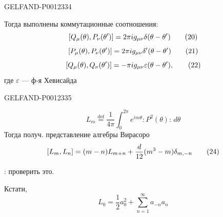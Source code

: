 \begin{GelfandAdjacentEvidence}{GELFAND-P001233}{4}

Тогда выполнены коммутационные соотношения:
\begin{equation*}
\relax [Q_\mu(\theta),P_\nu(\theta')]=2\pi i g_{\mu\nu}\delta(\theta-\theta')\tag{20}
\end{equation*}
\begin{equation*}
\relax [P_\mu(\theta),P_\nu(\theta')]=2\pi i g_{\mu\nu}\delta'(\theta-\theta')\tag{21}
\end{equation*}
\begin{equation*}
\relax [Q_\mu(\theta),Q_\nu(\theta')]=-\pi i g_{\mu\nu}\varepsilon(\theta-\theta'),\tag{22}
\end{equation*}
где \(\varepsilon\) --- ф-я Хевисайда
\end{GelfandAdjacentEvidence}
\begin{GelfandAdjacentEvidence}{GELFAND-P001233}{5}

\begin{equation*}
L_m\overset{\mathrm{def}}{=}\frac1{4\pi}\int_0^{2\pi}
e^{im\theta}:P^2(\theta):\,d\theta\tag{23}
\end{equation*}
Тогда получ. представление алгебры Вирасоро
\begin{equation*}
\relax [L_m,L_n]=(m-n)L_{m+n}+\frac d{12}(m^3-m)\delta_{m,-n}\tag{24}
\end{equation*}
\end{GelfandAdjacentEvidence}


: проверить это.

Кстати,
\begin{equation*}
L_0=\frac12a_0^2+\sum_{n=1}^{\infty}a_{-n}a_n\tag{25}
\end{equation*}


